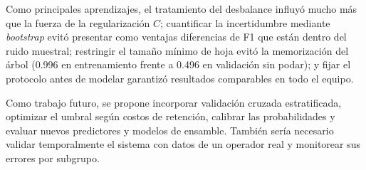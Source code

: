 Como principales aprendizajes, el tratamiento del desbalance influyó mucho más que la fuerza de la
regularización $C$; cuantificar la incertidumbre mediante \emph{bootstrap} evitó presentar como
ventajas diferencias de F1 que están dentro del ruido muestral; restringir el tamaño mínimo de hoja
evitó la memorización del árbol (0.996 en entrenamiento frente a 0.496 en validación sin podar); y
fijar el protocolo antes de modelar garantizó resultados comparables en todo el equipo.

Como trabajo futuro, se propone incorporar validación cruzada estratificada, optimizar el
umbral según costos de retención, calibrar las probabilidades y evaluar nuevos predictores y
modelos de ensamble. También sería necesario validar temporalmente el sistema con datos
de un operador real y monitorear sus errores por subgrupo.